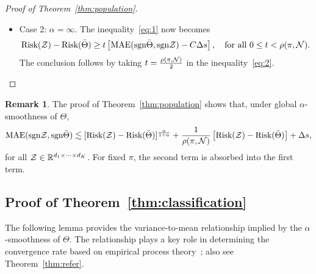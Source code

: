 \documentclass[11pt]{article}
\theoremstyle{plain}
\theoremstyle{definition}
\newtheorem{rmk}{Remark}[section]
\def\sign{\textup{sgn}}
\def\risk{\textup{Risk}}
\begin{document}
\begin{proof}[Proof of Theorem~\ref{thm:population}]
\begin{itemize}[leftmargin=*,topsep=0pt,itemsep=-1ex,partopsep=1ex,parsep=1ex]
where $C(\pi)>0$ is a multiplicative factor independent of $\tZ$. 
\item Case 2: $\alpha=\infty$. The inequality~\eqref{eq:1} now becomes
\begin{equation}\label{eq:2}
\risk(\tZ)- \risk(\bar \Theta) \geq t\left[\textup{MAE}(\sign \bar\Theta, \sign \tZ)-C\Delta s\right], \quad \text{for all }0\leq t< \rho(\pi,\tN).
\end{equation}
The conclusion follows by taking $t={\rho(\pi, \mathcal{N})\over 2}$ in the inequality~\eqref{eq:2}. 
\end{itemize}
\end{proof}
\begin{rmk}\label{eq:rmk}The proof of Theorem~\ref{thm:population} shows that, under global $\alpha$-smoothness of $\Theta$, 
\begin{equation}\label{eq:remark}
\textup{MAE}(\sign \tZ,\sign \bar \Theta)  \lesssim [\risk(\tZ)- \risk(\bar \Theta)]^{\alpha\over 1+\alpha}+{1\over \rho(\pi, \tN)} \left[\risk(\tZ)- \risk(\bar \Theta)\right]+\Delta s,
\end{equation}
for all $\mathcal{Z}\in\mathbb{R}^{d_1\times \cdots \times d_K}$. For fixed $\pi$, the second term is absorbed into the first term. 
\end{rmk}

\subsection{Proof of Theorem~\ref{thm:classification}}
The following lemma provides the variance-to-mean relationship implied by the $\alpha$-smoothness of $\Theta$. The relationship plays a key role in determining the convergence rate based on empirical process theory~\citep{shen1994convergence}; also see Theorem~\ref{thm:refer}.
\end{document}
